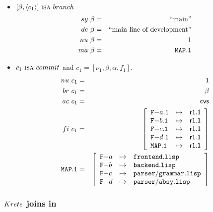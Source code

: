 \documentclass[fleqn, 10pt, a4paper]{article}
\begin{document}
\begin{itemize}
\item $[\beta, \langle c_1\rangle]\ \mbox{\textsc{isa}}\ \mathnormal{branch}$
\begin{eqnarray*}
\mathnormal{sy}\ \beta &=& \mbox{``main''} \\
\mathnormal{de}\ \beta &=& \mbox{``main line of development''} \\
\mathnormal{nu}\ \beta &=& 1 \\
\mathnormal{ma}\ \beta &=& \mathtt{MAP.1}
\end{eqnarray*}

\item $c_1\ \mbox{\textsc{isa}}\ \mathnormal{commit}$ and
$c_1=[\nu_1, \beta, \alpha, f_1]$.
\begin{eqnarray*}
\mathnormal{nu}\ c_1 &=& 1 \\
\mathnormal{br}\ c_1 &=& \beta \\
\mathnormal{ac}\ c_1 &=& \mathsf{cvs} \\
\mathnormal{fi}\ c_1 &=& \left[
\begin{array}{lcl}
\mathtt{F-}a\mathtt{.1} & \mapsto & \mathsf{r1.1} \\
\mathtt{F-}b\mathtt{.1} & \mapsto & \mathsf{r1.1} \\
\mathtt{F-}c\mathtt{.1} & \mapsto & \mathsf{r1.1} \\
\mathtt{F-}d\mathtt{.1} & \mapsto & \mathsf{r1.1} \\
\mathtt{MAP.1}         & \mapsto & \mathsf{r1.1} \\
\end{array}\right] \\
\mathtt{MAP.1} &=& \left[
\begin{array}{lcl}
\mathtt{F-}a &\mapsto& \mathtt{frontend.lisp} \\
\mathtt{F-}b &\mapsto& \mathtt{backend.lisp} \\
\mathtt{F-}c &\mapsto& \mathtt{parser/grammar.lisp} \\
\mathtt{F-}d &\mapsto& \mathtt{parser/absy.lisp} \\
\end{array}\right]
\end{eqnarray*}
\end{itemize}

\subsubsection{$\mathnormal{Krete}$ joins in}
\end{document}

